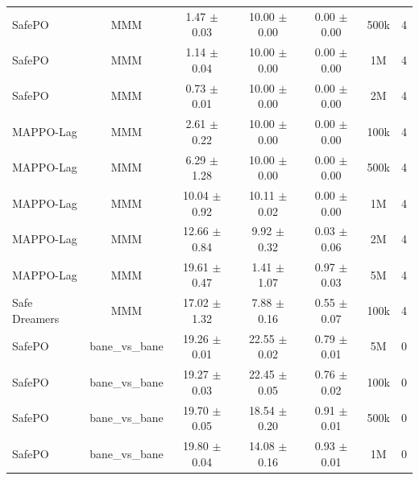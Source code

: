 \begin{longtable}{lcccccc}
SafePO & MMM & \textcolor{green!60!black}{1.47 $\pm$ 0.03} & \textcolor{green!60!black}{1\textcolor{green!60!black}{0.00 $\pm$ 0.00}} & 0.00 $\pm$ 0.00 & 500k & 4 \\
SafePO & MMM & \textcolor{green!60!black}{1.14 $\pm$ 0.04} & \textcolor{green!60!black}{1\textcolor{green!60!black}{0.00 $\pm$ 0.00}} & 0.00 $\pm$ 0.00 & 1M & 4 \\
SafePO & MMM & \textcolor{green!60!black}{0.73 $\pm$ 0.01} & \textcolor{green!60!black}{1\textcolor{green!60!black}{0.00 $\pm$ 0.00}} & 0.00 $\pm$ 0.00 & 2M & 4 \\
MAPPO-Lag & MMM & \textcolor{green!60!black}{2.61 $\pm$ 0.22} & \textcolor{green!60!black}{1\textcolor{green!60!black}{0.00 $\pm$ 0.00}} & 0.00 $\pm$ 0.00 & 100k & 4 \\
MAPPO-Lag & MMM & \textcolor{green!60!black}{6.29 $\pm$ 1.28} & \textcolor{green!60!black}{1\textcolor{green!60!black}{0.00 $\pm$ 0.00}} & 0.00 $\pm$ 0.00 & 500k & 4 \\
MAPPO-Lag & MMM & \textcolor{green!60!black}{10.04 $\pm$ 0.92} & \textcolor{green!60!black}{10.11 $\pm$ 0.02} & \textcolor{green!60!black}{0.00 $\pm$ 0.00} & 1M & 4 \\
MAPPO-Lag & MMM & \textcolor{green!60!black}{12.66 $\pm$ 0.84} & \textcolor{green!60!black}{9.92 $\pm$ 0.32} & \textcolor{green!60!black}{0.03 $\pm$ 0.06} & 2M & 4 \\
MAPPO-Lag & MMM & \textcolor{red!70!black}{19.61 $\pm$ 0.47} & \textcolor{red!70!black}{1.41 $\pm$ 1.07} & \textcolor{red!70!black}{0.97 $\pm$ 0.03} & 5M & 4 \\
Safe Dreamers & MMM & 17.02 $\pm$ 1.32 & 7.88 $\pm$ 0.16 & 0.55 $\pm$ 0.07 & 100k & 4 \\
\midrule
SafePO & bane\_vs\_bane & \textcolor{red!70!black}{19.26 $\pm$ 0.01} & \textcolor{green!60!black}{22.55 $\pm$ 0.02} & \textcolor{red!70!black}{0.79 $\pm$ 0.01} & 5M & 0 \\
SafePO & bane\_vs\_bane & \textcolor{red!70!black}{19.27 $\pm$ 0.03} & \textcolor{green!60!black}{22.45 $\pm$ 0.05} & \textcolor{red!70!black}{0.76 $\pm$ 0.02} & 100k & 0 \\
SafePO & bane\_vs\_bane & \textcolor{red!70!black}{19.70 $\pm$ 0.05} & \textcolor{green!60!black}{18.54 $\pm$ 0.20} & \textcolor{red!70!black}{0.91 $\pm$ 0.01} & 500k & 0 \\
SafePO & bane\_vs\_bane & \textcolor{red!70!black}{19.80 $\pm$ 0.04} & \textcolor{green!60!black}{14.08 $\pm$ 0.16} & \textcolor{red!70!black}{0.93 $\pm$ 0.01} & 1M & 0 \\

\end{longtable}
